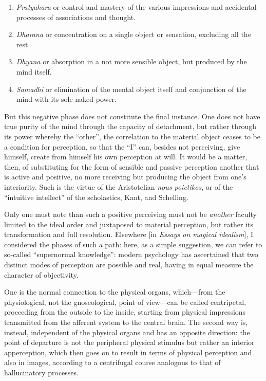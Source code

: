 \begin{enumerate}
\item \textit{Pratyahara} or control and mastery of the various impressions and accidental processes of associations and thought. 
\item \textit{Dharana} or concentration on a single object or sensation, excluding all the rest. 
\item \textit{Dhyana} or absorption in a not more sensible object, but produced by the mind itself. 
\item \textit{Samadhi} or elimination of the mental object itself and conjunction of the mind with its sole naked power. 
\end{enumerate}
But this negative phase does not constitute the final instance. One does not have true purity of the mind through the capacity of detachment, but rather through its power whereby the “other”, the correlation to the material object ceases to be a condition for perception, so that the “I” can, besides not perceiving, give himself, create from himself his own perception at will. It would be a matter, then, of substituting for the form of sensible and passive perception another that is active and positive, no more receiving but producing the object from one's interiority. Such is the virtue of the Aristotelian \textit{nous poietikos}, or of the “intuitive intellect” of the scholastics, Kant, and Schelling.

Only one must note than such a positive perceiving must not be \textit{another} faculty limited to the ideal order and juxtaposed to material perception, but rather its transformation and full resolution. Elsewhere [in \emph{Essays on magical idealism}], I considered the phases of such a path: here, as a simple suggestion, we can refer to so-called “supernormal knowledge”: modern psychology has ascertained that two distinct modes of perception are possible and real, having in equal measure the character of objectivity.

One is the normal connection to the physical organs, which—from the physiological, not the gnoseological, point of view—can be called centripetal, proceeding from the outside to the inside, starting from physical impressions transmitted from the afferent system to the central brain. The second way is, instead, independent of the physical organs and has an opposite direction: the point of departure is not the peripheral physical stimulus but rather an interior apperception, which then goes on to result in terms of physical perception and also in images, according to a centrifugal course analogous to that of hallucinatory processes.

